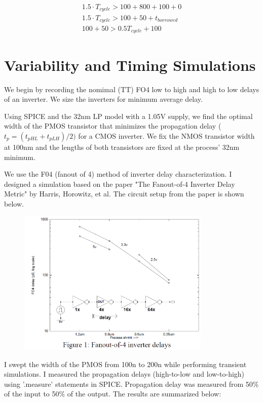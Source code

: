 \documentclass[11pt]{article}
\begin{document}
\begin{eqnarray}
	1.5 \cdot T_{cycle} > 100 + 800 + 100 + 0 \nonumber \\
	1.5 \cdot T_{cycle} > 100 + 50 + t_{borrowed} \nonumber \\
	100 + 50 > 0.5 T_{cycle} + 100 \nonumber 
\end{eqnarray}



\section{Variability and Timing Simulations}

We begin by recording the nomimal (TT) FO4 low to high and high to low delays of an inverter. We size the inverters for minimum average delay.

Using SPICE and the 32nm LP model with a 1.05V supply, we find the optimal width of the PMOS transistor that minimizes the propagation delay ($t_{p} = (t_{pHL} + t_{pLH}) / 2)$ for a CMOS inverter. We fix the NMOS transistor width at 100nm and the lengths of both transistors are fixed at the process' 32nm minimum.

We use the F04 (fanout of 4) method of inverter delay characterization. I designed a simulation based on the paper "The Fanout-of-4 Inverter Delay Metric" by Harris, Horowitz, et al. The circuit setup from the paper is shown below.

\begin{figure}[H]
	\centerline{\includegraphics[height=7cm]{images/f04_figure.png}}
\end{figure}

I swept the width of the PMOS from 100n to 200n while performing transient simulations. I measured the propagation delays (high-to-low and low-to-high) using '.measure' statements in SPICE. Propagation delay was measured from 50\% of the input to 50\% of the output. The results are summarized below:
\end{document}
